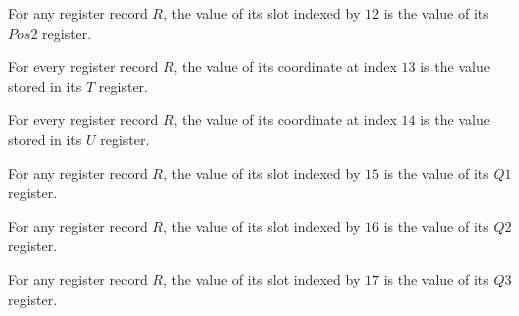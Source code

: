 \begin{lemma}
\label{Complexity.Codec.Regs.val_Pos2}
\leanok
{}
For any register record $R$, the value of its slot indexed by $12$ is the value of its
$Pos2$ register.
\end{lemma}

\begin{lemma}
\label{Complexity.Codec.Regs.val_T}
\leanok
{}
For every register record $R$, the value of its coordinate at index $13$ is the value
stored in its $T$ register.
\end{lemma}

\begin{lemma}
\label{Complexity.Codec.Regs.val_U}
\leanok
{}
For every register record $R$, the value of its coordinate at index $14$ is the value
stored in its $U$ register.
\end{lemma}

\begin{lemma}
\label{Complexity.Codec.Regs.val_Q1}
\leanok
{}
For any register record $R$, the value of its slot indexed by $15$ is the value of its
$Q1$ register.
\end{lemma}

\begin{lemma}
\label{Complexity.Codec.Regs.val_Q2}
\leanok
{}
For any register record $R$, the value of its slot indexed by $16$ is the value of its
$Q2$ register.
\end{lemma}

\begin{lemma}
\label{Complexity.Codec.Regs.val_Q3}
\leanok
{}
For any register record $R$, the value of its slot indexed by $17$ is the value of its
$Q3$ register.
\end{lemma}

